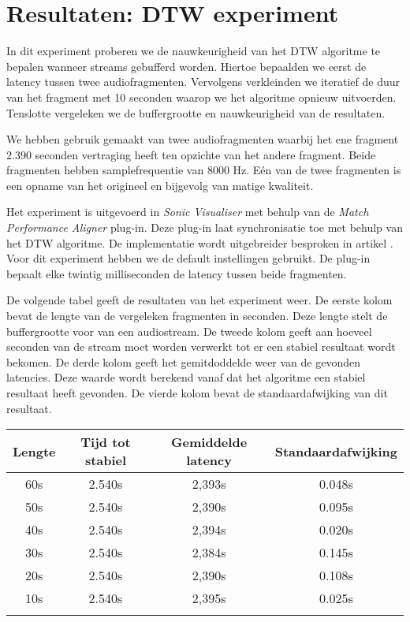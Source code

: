 \chapter{Resultaten: DTW experiment}
\label{appendix-a}

In dit experiment proberen we de nauwkeurigheid van het DTW algoritme te bepalen wanneer streams gebufferd worden. Hiertoe bepaalden we eerst de latency tussen twee audiofragmenten. Vervolgens verkleinden we iteratief de duur van het fragment met 10 seconden waarop we het algoritme opnieuw uitvoerden. Tenslotte vergeleken we de buffergrootte en nauwkeurigheid van de resultaten.

We hebben gebruik gemaakt van twee audiofragmenten waarbij het ene fragment 2.390 seconden vertraging heeft ten opzichte van het andere fragment. Beide fragmenten hebben samplefrequentie van 8000 Hz. Eén van de twee fragmenten is een opname van het origineel en bijgevolg van matige kwaliteit.

Het experiment is uitgevoerd in \textit{Sonic Visualiser} met behulp van de \textit{Match Performance Aligner} plug-in. Deze plug-in laat synchronisatie toe met behulp van het DTW algoritme. De implementatie wordt uitgebreider besproken in artikel \cite{dixon2005match}. Voor dit experiment hebben we de default instellingen gebruikt. De plug-in bepaalt elke twintig milliseconden de latency tussen beide fragmenten.

De volgende tabel geeft de resultaten van het experiment weer. De eerste kolom bevat de lengte van de vergeleken fragmenten in seconden. Deze lengte stelt de buffergrootte voor van een audiostream. De tweede kolom geeft aan hoeveel seconden van de stream moet worden verwerkt tot er een stabiel resultaat wordt bekomen. De derde kolom geeft het gemitdoddelde weer van de gevonden latencies. Deze waarde wordt berekend vanaf dat het algoritme een stabiel resultaat heeft gevonden. De vierde kolom bevat de standaardafwijking van dit resultaat.\\

\begin{center}
\begin{tabular}{ c  c  c  c }
	\hline
	\textbf{Lengte} & \textbf{Tijd tot stabiel} & \textbf{Gemiddelde latency} & \textbf{Standaardafwijking} \\
	\hline
	60s & 2.540s & 2,393s & 0.048s \\
	50s & 2.540s & 2,390s & 0.095s \\
	40s & 2.540s & 2,394s & 0.020s \\
	30s & 2.540s & 2,384s & 0.145s \\
	20s & 2.540s & 2,390s & 0.108s \\
	10s & 2.540s & 2,395s & 0.025s \\
	\\
\end{tabular}\\
\end{center}

